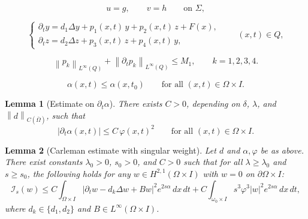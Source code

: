 \documentclass[10pt,a4paper]{amsart}
\newtheorem{lemma}{Lemma}
\newcommand{\Dt}{\p_t}
\newcommand{\Lap}{\Delta}
\newcommand{\Om}{\Omega}
\newcommand{\norm}[1]{\left\lVert#1\right\rVert}
\newcommand{\p}{\partial}
\begin{document}
\begin{equation}\label{eq:bc}
u=g,\qquad v=h\qquad\text{on }\Sigma,
\end{equation}

\begin{equation}\label{eq:diffsystem}
\begin{cases}
\Dt y = d_1 \Lap y + p_1(x,t)\,y + p_2(x,t)\,z + F(x),\\[3pt]
\Dt z = d_2 \Lap z + p_3(x,t)\,z + p_4(x,t)\,y,
\end{cases}
\qquad (x,t)\in Q,
\end{equation}

\begin{equation}\label{eq:pk-bounds}
\norm{p_k}_{L^\infty(Q)}+\norm{\p_t p_k}_{L^\infty(Q)}\le M_1,
\qquad k=1,2,3,4.
\end{equation}

\begin{equation}\label{eq:alpha-max}
\alpha(x,t)\le \alpha(x,t_0)\qquad\text{for all }
(x,t)\in\Omega\times I.
\end{equation}

\begin{lemma}[Estimate on $\p_t\alpha$]\label{lem:dtalpha}
There exists $C>0$, depending on $\delta$, $\lambda$, and
$\norm{d}_{C(\overline\Om)}$, such that
\begin{equation}\label{eq:dtalpha}
|\partial_t\alpha(x,t)|\le C\,\varphi(x,t)^2
\qquad\text{for all }(x,t)\in\Omega\times I.
\end{equation}
\end{lemma}

\begin{lemma}[Carleman estimate with singular weight]\label{lem:carleman}
Let $d$ and $\alpha,\varphi$ be as above.
There exist constants $\lambda_0>0$, $s_0>0$, and $C>0$ such that for all
$\lambda\ge\lambda_0$ and $s\ge s_0$, the following holds for any
$w\in H^{2,1}(\Omega\times I)$ with $w=0$ on $\partial\Omega\times I$:
\begin{equation}\label{eq:carleman-scalar}
\mathcal I_s(w)\le
C\int_{\Omega\times I}
\bigl|\partial_t w-d_k\Delta w + B w\bigr|^2 e^{2s\alpha}\,dx\,dt
+C\int_{\omega_0\times I} s^3\varphi^3 |w|^2 e^{2s\alpha}\,dx\,dt,
\end{equation}
where $d_k\in\{d_1,d_2\}$ and $B\in L^\infty(\Om\times I)$.
\end{lemma}
\end{document}
